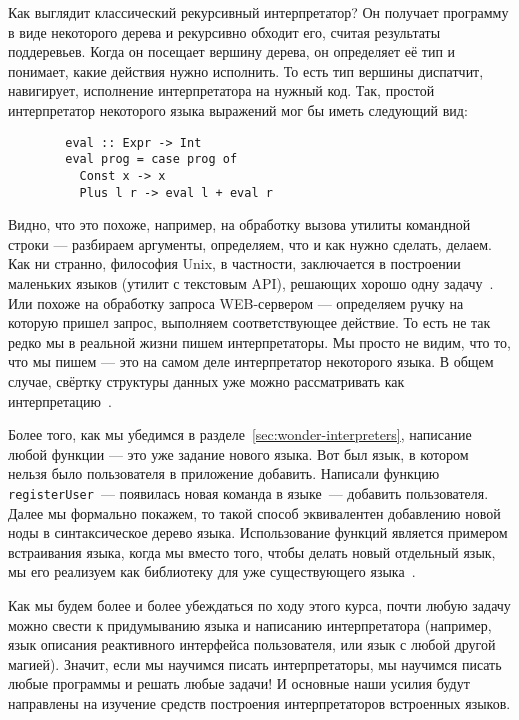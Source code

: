 \documentclass[12pt]{article}
\begin{document}
    Как выглядит классический рекурсивный интерпретатор?
    Он получает программу в виде некоторого дерева и рекурсивно обходит его, считая результаты поддеревьев.
    Когда он посещает вершину дерева, он определяет её тип и понимает, какие действия нужно исполнить.
    То есть тип вершины диспатчит, навигирует, исполнение интерпретатора на нужный код.
    Так, простой интерпретатор некоторого языка выражений мог бы иметь следующий вид:
    \begin{verbatim}
        eval :: Expr -> Int
        eval prog = case prog of
          Const x -> x
          Plus l r -> eval l + eval r
    \end{verbatim}

    Видно, что это похоже, например, на обработку вызова утилиты командной строки --- разбираем аргументы, определяем, что и как нужно сделать, делаем.
    Как ни странно, философия Unix, в частности, заключается в построении маленьких языков (утилит с текстовым API), решающих хорошо одну задачу~\cite{bentley1986little}.
    Или похоже на обработку запроса WEB-сервером --- определяем ручку на которую пришел запрос, выполняем соответствующее действие.
    То есть не так редко мы в реальной жизни пишем интерпретаторы.
    Мы просто не видим, что то, что мы пишем --- это на самом деле интерпретатор некоторого языка.
    В общем случае, свёртку структуры данных уже можно рассматривать как интерпретацию~\cite{gibbons2014folding}.


    Более того, как мы убедимся в разделе~\ref{sec:wonder-interpreters}, написание любой функции --- это уже задание нового языка.
    Вот был язык, в котором нельзя было пользователя в приложение добавить.
    Написали функцию \texttt{registerUser}~--- появилась новая команда в языке~--- добавить пользователя.
    Далее мы формально покажем, то такой способ эквивалентен добавлению новой ноды в синтаксическое дерево языка.
    Использование функций является примером встраивания языка, когда мы вместо того, чтобы делать новый отдельный язык, мы его реализуем как библиотеку для уже существующего языка~\cite{gibbons2013functional}.

    Как мы будем более и более убеждаться по ходу этого курса, почти любую задачу можно свести к придумыванию языка и написанию интерпретатора (например, язык описания реактивного интерфейса пользователя, или язык с любой другой магией).
    Значит, если мы научимся писать интерпретаторы, мы научимся писать любые программы и решать любые задачи!
    И основные наши усилия будут направлены на изучение средств построения интерпретаторов встроенных языков.
\end{document}

